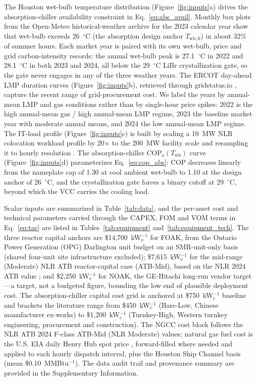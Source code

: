 \documentclass[a4paper,fleqn]{cas-sc}
\begin{document}
The Houston wet-bulb temperature distribution (Figure~\ref{fig:inputs}a) drives the absorption-chiller availability constraint in Eq.~\eqref{eq:abs_avail}. Monthly box plots from the Open-Meteo historical-weather archive \citep{openmeteo2023} for the 2023 calendar year show that wet-bulb exceeds 26~$^\circ$C (the absorption design anchor $T_\mathrm{wb,0}$) in about 32\% of summer hours. Each market year is paired with its own wet-bulb, price and grid carbon-intensity records; the annual wet-bulb peak is 27.1~$^\circ$C in 2022 and 28.1~$^\circ$C in both 2023 and 2024, all below the 29~$^\circ$C LiBr crystallization gate, so the gate never engages in any of the three weather years. The ERCOT day-ahead LMP duration curves (Figure~\ref{fig:inputs}b), retrieved through gridstatus.io \citep{gridstatus}, capture the recent range of grid-procurement cost. We label the years by annual-mean LMP and gas conditions rather than by single-hour price spikes: 2022 is the high annual-mean gas / high annual-mean LMP regime, 2023 the baseline market year with moderate annual means, and 2024 the low annual-mean LMP regime. The IT-load profile (Figure~\ref{fig:inputs}c) is built by scaling a 10~MW NLR colocation workload profile by 20$\times$ to the 200~MW facility scale and resampling it to hourly resolution \citep{vercellino2026aiworkload}. The absorption-chiller $\mathrm{COP}_\mathrm{a}(T_\mathrm{wb})$ curve (Figure~\ref{fig:inputs}d) parameterizes Eq.~\eqref{eq:cop_abs}: COP decreases linearly from the nameplate cap of 1.30 at cool ambient wet-bulb to 1.10 at the design anchor of 26~$^\circ$C, and the crystallization gate forces a binary cutoff at 29~$^\circ$C, beyond which the VCC carries the cooling load.

Scalar inputs are summarized in Table~\ref{tab:data}, and the per-asset cost and technical parameters carried through the CAPEX, FOM and VOM terms in Eq.~\eqref{eq:tac} are listed in Tables~\ref{tab:equipment} and~\ref{tab:equipment_tech}. The three reactor capital anchors are \$14{,}700~kW$_\mathrm{e}^{-1}$ for FOAK, from the Ontario Power Generation (OPG) Darlington unit budget on an SMR-unit-only basis (shared four-unit site infrastructure excluded); \$7{,}615~kW$_\mathrm{e}^{-1}$ for the mid-range (Moderate) NLR ATB reactor-capital case (ATB-Mid), based on the NLR 2024 ATB value \citep{atb2024nuclear}; and \$2{,}250~kW$_\mathrm{e}^{-1}$ for NOAK, the GE-Hitachi long-run vendor target---a target, not a budgeted figure, bounding the low end of plausible deployment cost. The absorption-chiller capital cost grid is anchored at \$750~kW$_\mathrm{c}^{-1}$ baseline and brackets the literature range from \$450~kW$_\mathrm{c}^{-1}$ (Bare-Low, Chinese manufacturer ex-works) to \$1{,}200~kW$_\mathrm{c}^{-1}$ (Turnkey-High, Western turnkey engineering, procurement and construction). The NGCC cost block follows the NLR ATB 2024 F-class ATB-Mid (NLR Moderate) values; natural gas fuel cost is the U.S. EIA daily Henry Hub spot price \citep{eiaHenryHub}, forward-filled where needed and applied to each hourly dispatch interval, plus the Houston Ship Channel basis (mean \$0.10~MMBtu$^{-1}$). The data audit trail and provenance summary are provided in the Supplementary Information.
\end{document}
